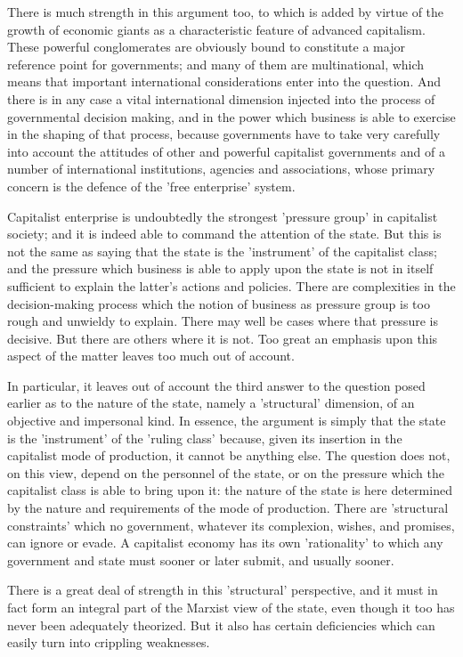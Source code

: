 There is much strength in this argument too, to which is added by virtue of the growth of economic giants as a characteristic feature of advanced capitalism. These powerful conglomerates are obviously bound to constitute a major reference point for governments; and many of them are multinational, which means that important international considerations enter into the question. And there is in any case a vital international dimension injected into the process of governmental decision making, and in the power which business is able to exercise in the shaping of that process, because governments have to take very carefully into account the attitudes of other and powerful capitalist governments and of a number of international institutions, agencies and associations, whose primary concern is the defence of the 'free enterprise' system.

Capitalist enterprise is undoubtedly the strongest 'pressure group' in capitalist society; and it is indeed able to command the attention of the state. But this is not the same as saying that the state is the 'instrument' of the capitalist class; and the pressure which business is able to apply upon the state is not in itself sufficient to explain the latter's actions and policies. There are complexities in the decision-making process which the notion of business as pressure group is too rough and unwieldy to explain. There may well be cases where that pressure is decisive. But there are others where it is not. Too great an emphasis upon this aspect of the matter leaves too much out of account.

In particular, it leaves out of account the third answer to the question posed earlier as to the nature of the state, namely a 'structural' dimension, of an objective and impersonal kind. In essence, the argument is simply that the state is the 'instrument' of the 'ruling class' because, given its insertion in the capitalist mode of production, it cannot be anything else. The question does not, on this view, depend on the personnel of the state, or on the pressure which the capitalist class is able to bring upon it: the nature of the state is here determined by the nature and requirements of the mode of production. There are 'structural constraints' which no government, whatever its complexion, wishes, and promises, can ignore or evade. A capitalist economy has its own 'rationality' to which any government and state must sooner or later submit, and usually sooner.

There is a great deal of strength in this 'structural' perspective,  and it must in fact form an integral part of the Marxist view of the state, even though it too has never been adequately theorized. But it also has certain deficiencies which can easily turn into crippling weaknesses.

